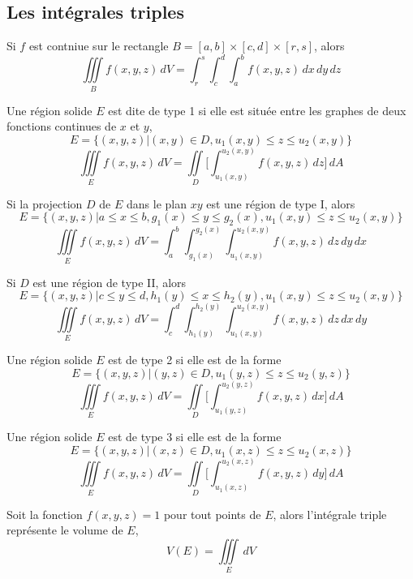 	\subsection{Les intégrales triples}
		\begin{mythm}
			Si $f$ est contniue sur le rectangle $B=[a,b]\times[c,d]\times[r,s]$, alors
			\[\iiint\limits_B f(x,y,z)\, dV=\int_r^s\int_c^d\int_a^b f(x,y,z)\, dx\, dy\, dz\]
		\end{mythm}
		\begin{mydef}
			Une région solide $E$ est dite de type 1 si elle est située entre les graphes de deux fonctions continues de $x$ et $y$,
			\[E=\big\{(x,y,z) \vert (x,y)\in D, u_1(x,y)\leq z\leq u_2(x,y) \big\}\]
			\[\iiint\limits_E f(x,y,z)\, dV = \iint\limits_D\bigg[\int_{u_1(x,y)}^{u_2(x,y)}f(x,y,z)\, dz\bigg]\, dA\]
		\end{mydef}
		\begin{mydef}
			Si la projection $D$ de $E$ dans le plan $xy$ est une région de type I, alors
			\[E=\big\{(x,y,z) \vert a\leq x\leq b,g_1(x)\leq y\leq g_2(x), u_1(x,y)\leq z\leq u_2(x,y) \big\}\]
			\[\iiint\limits_E f(x,y,z)\, dV = \int_a^b\int_{g_1(x)}^{g_2(x)}\int_{u_1(x,y)}^{u_2(x,y)}f(x,y,z)\, dz\, dy\, dx\]
		\end{mydef}
		\begin{mydef}
			Si  $D$ est une région de type II, alors
			\[E=\big\{(x,y,z) \vert c\leq y \leq d,h_1(y)\leq x\leq h_2(y), u_1(x,y)\leq z\leq u_2(x,y) \big\}\]
			\[\iiint\limits_E f(x,y,z)\, dV = \int_c^d\int_{h_1(y)}^{h_2(y)}\int_{u_1(x,y)}^{u_2(x,y)}f(x,y,z)\, dz\, dx\, dy\]
		\end{mydef}
		\begin{mydef}
			Une région solide $E$ est de type 2 si elle est de la forme
			\[E=\big\{(x,y,z) \vert  (y,z)\in D, u_1(y,z)\leq z\leq u_2(y,z) \big\}\]
			\[\iiint\limits_E f(x,y,z)\, dV = \iint\limits_D\bigg[ \int_{u_1(y,z)}^{u_2(y,z)}f(x,y,z)\, dx\bigg]\, dA\]
		\end{mydef}
		\begin{mydef}
			Une région solide $E$ est de type 3 si elle est de la forme
			\[E=\big\{(x,y,z) \vert  (x,z)\in D, u_1(x,z)\leq z\leq u_2(x,z) \big\}\]
			\[\iiint\limits_E f(x,y,z)\, dV = \iint\limits_D\bigg[ \int_{u_1(x,z)}^{u_2(x,z)}f(x,y,z)\, dy\bigg]\, dA\]
		\end{mydef}
		\begin{myprop}
		Soit la fonction $f(x,y,z)=1$ pour tout points de $E$, alors l'intégrale triple représente le volume de $E$, \[V(E)=\iiint\limits_E\, dV\]
	\end{myprop}
